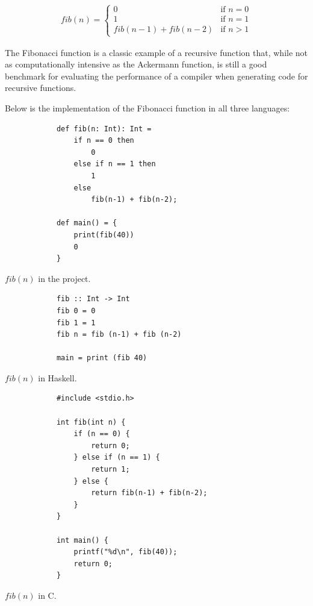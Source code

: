 \singlespacing
\vspace{-0.7cm}
\begin{align*}
    fib(n) = \begin{cases}
        0 & \text{if } n = 0 \\
        1 & \text{if } n = 1 \\
        fib(n - 1) + fib(n - 2) & \text{if } n > 1
    \end{cases}
\end{align*}
\doublespacing

The Fibonacci function is a classic example of a recursive function that, while not as
computationally intensive as the Ackermann function, is still a good benchmark for evaluating the
performance of a compiler when generating code for recursive functions.

Below is the implementation of the Fibonacci function in all three languages:

\vspace{0.3cm}
\begin{tcbitemize}[raster columns=3, raster equal height=rows,size=small,space to upper]
    \tcbitem
        \footnotesize
        \begin{verbatim}
            def fib(n: Int): Int =
                if n == 0 then
                    0
                else if n == 1 then
                    1
                else
                    fib(n-1) + fib(n-2);

            def main() = {
                print(fib(40))
                0
            }
        \end{verbatim}
        \tcblower
        \footnotesize $fib(n)$ in the project.
    \tcbitem
        \footnotesize
        \begin{verbatim}
            fib :: Int -> Int
            fib 0 = 0
            fib 1 = 1
            fib n = fib (n-1) + fib (n-2)

            main = print (fib 40)
        \end{verbatim}
        \vfill
        \tcblower
        \footnotesize $fib(n)$ in Haskell.
    \tcbitem
        \scriptsize
        \begin{verbatim}
            #include <stdio.h>

            int fib(int n) {
                if (n == 0) {
                    return 0;
                } else if (n == 1) {
                    return 1;
                } else {
                    return fib(n-1) + fib(n-2);
                }
            }

            int main() {
                printf("%d\n", fib(40));
                return 0;
            }
        \end{verbatim}
        \tcblower
        \footnotesize $fib(n)$ in C.
\end{tcbitemize}
\vspace{0.4cm}

